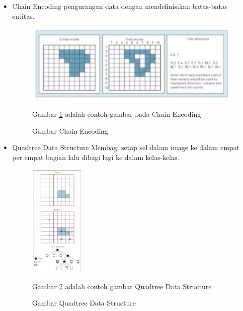 \begin{itemize}
		\item  Chain Encoding
				pengurangan data dengan mendefinisikan batas-batas entitas.
				\begin{figure} [ht]
					\centerline{\includegraphics[width=1\textwidth]{figures/chainencoding.JPG}}
					\caption{Gambar Chain Encoding}
					\label{chainencoding}
					Gambar \ref{chainencoding} adalah contoh gambar pada Chain Encoding
				\end{figure}

		\item  Quadtree Data Structure
				Membagi setap sel dalam image ke dalam empat per empat bagian lalu dibagi lagi ke dalam kelas-kelas.
				\begin{figure} [ht]
					\centerline{\includegraphics[width=0.25\textwidth]{figures/quadtreedatastructure.JPG}}
					\caption{Gambar Quadtree Data Structure}
					\label{quadtreedatastructure}
					Gambar \ref{quadtreedatastructure} adalah contoh gambar Quadtree Data Structure
				\end{figure}
	\end{itemize}

